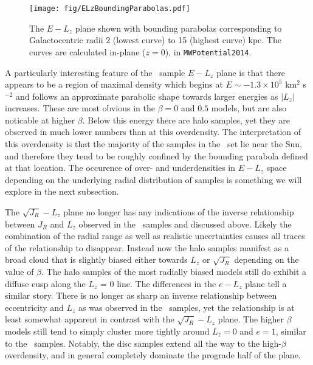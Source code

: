 \begin{figure}
    \centering
    \texttt{[image: fig/ELzBoundingParabolas.pdf]}
    \caption{The $E-L_{z}$ plane shown with bounding parabolas corresponding to Galactocentric radii 2 (lowest curve) to 15 (highest curve) kpc. The curves are calculated in-plane ($z=0$), in \texttt{MWPotential2014}.}
    \label{fig:ELzBoundaries}
\end{figure}

A particularly interesting feature of the \survey\ sample $E-L_{z}$ plane is that there appears to be a region of maximal density which begins at $E \sim -1.3\times10^{5}$ km$^{2}$ s$^{-2}$ and follows an approximate parabolic shape towards larger energies as $\lvert L_{z} \rvert$ increases. These are most obvious in the $\beta=0$ and $0.5$ models, but are also noticable at higher $\beta$. Below this energy there are halo samples, yet they are observed in much lower numbers than at this overdensity. The interpretation of this overdensity is that the majority of the samples in the \survey\ set lie near the Sun, and therefore they tend to be roughly confined by the bounding parabola defined at that location. The occurence of over- and underdensities in $E-L_{z}$ space depending on the underlying radial distribution of samples is something we will explore in the next subsection.

The $\sqrt{J_{R}}-L_{z}$ plane no longer has any indications of the inverse relationship between $J_{R}$ and $L_{z}$ observed in the \solar\ samples and discussed above. Likely the combination of the radial range as well as realistic uncertainties causes all traces of the relationship to disappear. Instead now the halo samples manifest as a broad cloud that is slightly biased either towards $L_{z}$ or $\sqrt{J_{R}}$ depending on the value of $\beta$. The halo samples of the most radially biased models still do exhibit a diffuse cusp along the $L_{z}$ = 0 line. The differences in the $e-L_{z}$ plane tell a similar story. There is no longer as sharp an inverse relationship between eccentricity and $L_{z}$ as was observed in the \solar\ samples, yet the relationship is at least somewhat apparent in contrast with the $\sqrt{J_{R}}-L_{z}$ plane. The higher $\beta$ models still tend to simply cluster more tightly around $L_{z}=0$ and $e=1$, similar to the \solar\ samples. Notably, the disc samples extend all the way to the high-$\beta$ overdensity, and in general completely dominate the prograde half of the plane.

